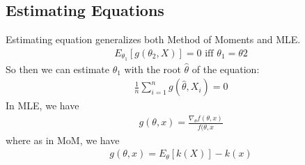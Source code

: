 \subsection{Estimating Equations} 
Estimating equation generalizes both Method of Moments and MLE. 
    \begin{align*}
        E_{\theta_1}[g(\theta_2, X)] = 0 \text{ iff } \theta_1 = \theta 2
    \end{align*}
So then we can estimate $\theta_1$ with the root $\hat{\theta}$ of the equation: 
    \begin{align*}
        \frac{1}{n} \sum_{i=1}^n g(\hat{\theta}, X_i) = 0
    \end{align*}
In MLE, we have 
    \begin{align*}
        g(\theta, x) = \frac{\nabla_\theta f(\theta,x)}{f(\theta,x}
    \end{align*}
where as in MoM, we have 
    \begin{align*}
        g(\theta, x) = E_\theta[k(X)] - k(x)
    \end{align*}
